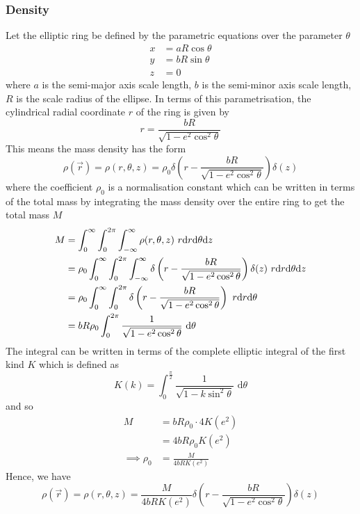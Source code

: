 \subsubsection{Density}
Let the elliptic ring be defined by the parametric equations over the parameter \( \theta \)
\begin{align}
    x & = aR \cos{\theta} \\
    y & = bR \sin{\theta} \\
    z & = 0
\end{align}
where \( a \) is the semi-major axis scale length, \( b \) is the semi-minor axis scale length, \( R \) is the scale radius of the
ellipse. In terms of this parametrisation, the cylindrical radial coordinate \( r \) of the ring is given by
\begin{equation}
    r = \frac{bR}{\sqrt{1 - e^2{\cos}^{2}{\theta}}}
\end{equation}
This means the mass density has the form
\begin{equation}
    \rho(\vec{r}) = \rho(r, \theta, z) = \rho_0 \delta\left(r - \frac{bR}{\sqrt{1 - e^2 \cos^2{\theta}}}\right) \delta(z)
\end{equation}
where the coefficient \( \rho_0 \) is a normalisation constant which can be written in terms of the total mass by integrating the
mass density over the entire ring to get the total mass \( M \)
\begin{align}
    M & = \int_{0}^{\infty} \int_{0}^{2\pi} \int_{-\infty}^{\infty} \rho(r, \theta, z) \,{}\,{} r \textrm{d}{r} \textrm{d}{\theta} \textrm{d}{z} \nonumber                                                               \\
      & = \rho_0 \int_{0}^{\infty} \int_{0}^{2\pi} \int_{-\infty}^{\infty} \delta\left(r - \frac{bR}{\sqrt{1 - e^2 \cos^2{\theta}}}\right) \delta(z) \,{}\,{} r \textrm{d}{r} \textrm{d}{\theta} \textrm{d}{z} \nonumber \\
      & = \rho_0 \int_{0}^{\infty} \int_{0}^{2\pi} \delta\left(r - \frac{bR}{\sqrt{1 - e^2 \cos^2{\theta}}}\right) \,{}\,{} r \textrm{d}{r} \textrm{d}{\theta} \nonumber                                          \\
      & = bR\rho_0 \int_{0}^{2\pi} \frac{1}{\sqrt{1-e^2\cos^2{\theta}}} \,{}\,{} \mathrm{d}\theta \nonumber
\end{align}
The integral can be written in terms of the complete elliptic integral of the first kind \( K \) which is defined as
\begin{equation}
    K(k) = \int_{0}^{\frac{\pi}{2}} \frac{1}{\sqrt{1- k \sin^2{\theta}}} \,{}\,{} \mathrm{d}\theta
\end{equation}
and so
\begin{align}
    M               & = bR\rho_0 \cdot 4 K\left(e^2\right) \nonumber \\
                    & = 4 b R \rho_0 K\left(e^2\right) \nonumber     \\
    \implies \rho_0 & = \frac{M}{4bR K\left(e^2\right)}
\end{align}
Hence, we have
\begin{equation}
    \rho(\vec{r}) = \rho(r, \theta, z) = \frac{M}{4bRK\left(e^2\right)}
    \delta\left(r - \frac{bR}{\sqrt{1 - e^2 \cos^2{\theta}}}\right) \delta(z) \label{density}
\end{equation}

